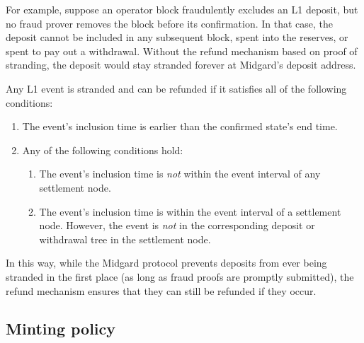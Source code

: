 \documentclass[../midgard.tex]{subfiles}
\begin{document}
For example, suppose an operator block fraudulently excludes an L1 deposit, but no fraud prover removes the block before its confirmation.
In that case, the deposit cannot be included in any subsequent block, spent into the reserves, or spent to pay out a withdrawal.
Without the refund mechanism based on proof of stranding, the deposit would stay stranded forever at Midgard's deposit address.

Any L1 event is stranded and can be refunded if it satisfies all of the following conditions:
\begin{enumerate}
  \item The event's inclusion time is earlier than the confirmed state's end time.
  \item Any of the following conditions hold:
    \begin{enumerate}
      \item The event's inclusion time is \emph{not} within the event interval of any settlement node.
      \item The event's inclusion time is within the event interval of a settlement node.
        However, the event is \emph{not} in the corresponding deposit or withdrawal tree in the settlement node.
    \end{enumerate}
\end{enumerate}

In this way, while the Midgard protocol prevents deposits from ever being stranded in the first place (as long as fraud proofs are promptly submitted), the refund mechanism ensures that they can still be refunded if they occur.

\subsection{Minting policy}
\label{h:settlement-queue-minting-policy}
\end{document}
